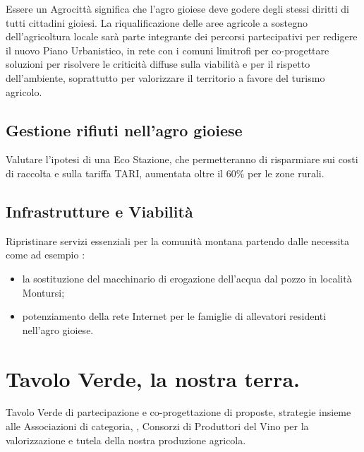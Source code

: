 \documentclass[a4paper,14pt,italian]{sphinxmanual}
\begin{document}
Essere un Agrocittà significa che l’agro gioiese deve godere degli stessi diritti di tutti cittadini gioiesi.
La riqualificazione delle aree agricole a sostegno dell’agricoltura locale sarà parte integrante dei percorsi partecipativi per redigere il nuovo Piano Urbanistico, in rete con i comuni limitrofi per co-progettare soluzioni per risolvere le criticità diffuse sulla viabilità e per il rispetto dell’ambiente, soprattutto per valorizzare il territorio a favore del turismo agricolo.


\subsection{Gestione rifiuti nell’agro gioiese}
\label{\detokenize{agricoltura:gestione-rifiuti-nell-agro-gioiese}}
Valutare l’ipotesi di una Eco Stazione, che permetteranno di risparmiare sui costi di raccolta e sulla tariffa TARI, aumentata oltre il 60\% per le zone rurali.





\subsection{Infrastrutture e Viabilità}
\label{\detokenize{agricoltura:infrastrutture-e-viabilita}}
Ripristinare servizi essenziali per la comunità montana partendo dalle necessita come ad esempio :
\begin{itemize}
\item {} 
la sostituzione del macchinario di erogazione dell’acqua dal pozzo in località Montursi;

\item {} 
potenziamento della rete Internet per le famiglie di allevatori residenti nell’agro gioiese.

\end{itemize}


\section{Tavolo Verde, la nostra terra.}
\label{\detokenize{agricoltura:tavolo-verde-la-nostra-terra}}
Tavolo Verde di partecipazione e co-progettazione di proposte, strategie insieme alle Associazioni di categoria, , Consorzi di Produttori del Vino per la valorizzazione e tutela della nostra produzione agricola.
\end{document}
